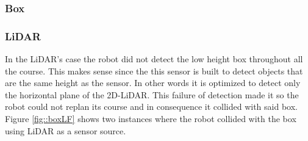 \subsubsection{Box}
\subsubsection*{LiDAR}
In the LiDAR's case the robot did not detect the low height box throughout all the course. This makes sense since the this sensor is built to detect objects that are the same height as the sensor. In other words it is optimized to detect only the horizontal plane of the 2D-\ac{LiDAR}. This failure of detection made it so the robot could not replan its course and in consequence it collided with said box. Figure \ref{fig::boxLF} shows two instances where the robot collided with the box using \ac{LiDAR} as a sensor source.

